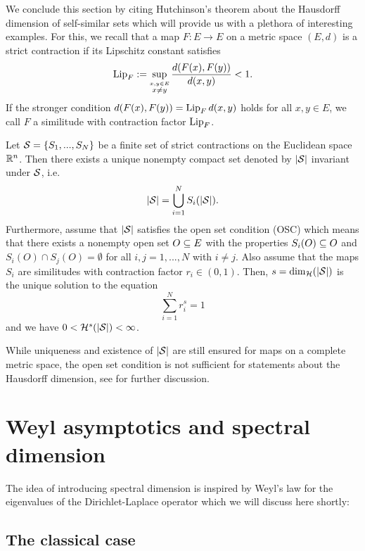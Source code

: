 We conclude this section by citing Hutchinson's theorem about the Hausdorff dimension of self-similar sets which will provide us with a plethora of interesting examples. For this, we recall that a map $F:E\to E$ on a metric space $(E,d)$ is a strict contraction if its Lipschitz constant satisfies
\[
  \operatorname{Lip}_F:=\sup_{\stackrel{x,y\in E}{x\neq y}}\frac{d(F(x),F(y))}{d(x,y)}<1.
\]
If the stronger condition $d(F(x),F(y))=\operatorname{Lip}_F d(x,y)$ holds for all $x,y\in E$, we call $F$ a similitude with contraction factor $\operatorname{Lip}_F$.
\begin{thm}\label{thm:hutchinson}
  Let $\mathcal{S}=\{S_1,...,S_N\}$ be a finite set of strict contractions on the Euclidean space $\mathbb{R}^n$. Then there exists a unique nonempty compact set denoted by $|\mathcal{S}|$ invariant under $\mathcal{S}$, i.e.
  \[
    |\mathcal{S}|=\bigcup_{i=1}^N S_i(|\mathcal{S}|).
  \]
  Furthermore, assume that $|\mathcal{S}|$ satisfies the open set condition (OSC) which means that there exists a nonempty open set $O\subseteq E$ with the properties $S_i(O)\subseteq O$ and $S_i(O)\cap S_j(O)=\emptyset$ for all $i,j=1,...,N$ with $i\neq j$. Also assume that the maps $S_i$ are similitudes with contraction factor $r_i\in(0,1)$. Then, $s=\dim_{\mathcal{H}}(|\mathcal{S}|)$ is the unique solution to the equation
  \[
    \sum_{i=1}^N r_i^s=1
  \]
  and we have $0<\mathcal{H}^s(|\mathcal{S}|)<\infty$. 
\end{thm}
While uniqueness and existence of $|\mathcal{S}|$ are still ensured for maps on a complete metric space, the open set condition is not sufficient for statements about the Hausdorff dimension, see \cite{schief1996self} for further discussion. 



\section{Weyl asymptotics and spectral dimension}

The idea of introducing spectral dimension is inspired by Weyl's law for the eigenvalues of the Dirichlet-Laplace operator which we will discuss here shortly:

\subsection{The classical case}


